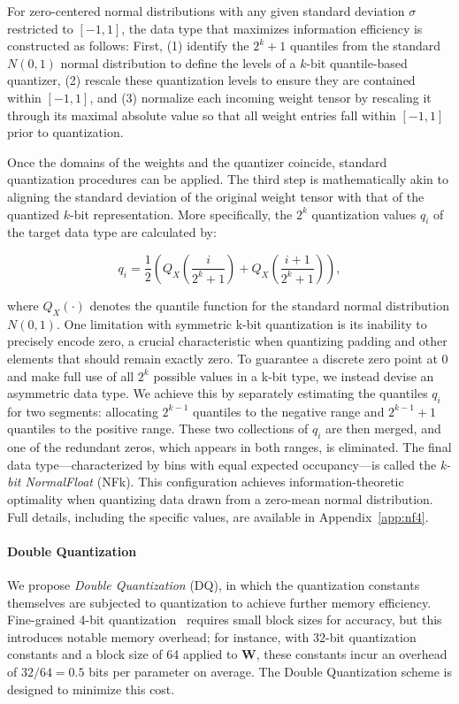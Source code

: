 For zero-centered normal distributions with any given standard deviation $\sigma$ restricted to $[-1, 1]$, the data type that maximizes information efficiency is constructed as follows: First, (1) identify the $2^k + 1$ quantiles from the standard $N(0, 1)$ normal distribution to define the levels of a $k$-bit quantile-based quantizer, (2) rescale these quantization levels to ensure they are contained within $[-1, 1]$, and (3) normalize each incoming weight tensor by rescaling it through its maximal absolute value so that all weight entries fall within $[-1, 1]$ prior to quantization.

Once the domains of the weights and the quantizer coincide, standard quantization procedures can be applied. The third step is mathematically akin to aligning the standard deviation of the original weight tensor with that of the quantized $k$-bit representation. More specifically, the $2^k$ quantization values $q_i$ of the target data type are calculated by:

\begin{equation}
q_i  = \frac{1}{2}\left( Q_X\left(\frac{i}{2^k+1}\right) + Q_X\left(\frac{i+1}{2^k+1}\right)\right),
\end{equation}

where $Q_X(\cdot)$ denotes the quantile function for the standard normal distribution $N(0,1)$. One limitation with symmetric k-bit quantization is its inability to precisely encode zero, a crucial characteristic when quantizing padding and other elements that should remain exactly zero. To guarantee a discrete zero point at $0$ and make full use of all $2^k$ possible values in a k-bit type, we instead devise an asymmetric data type. We achieve this by separately estimating the quantiles $q_i$ for two segments: allocating $2^{k-1}$ quantiles to the negative range and $2^{k-1}+1$ quantiles to the positive range. These two collections of $q_i$ are then merged, and one of the redundant zeros, which appears in both ranges, is eliminated. The final data type—characterized by bins with equal expected occupancy—is called the \emph{k-bit NormalFloat} (NFk). This configuration achieves information-theoretic optimality when quantizing data drawn from a zero-mean normal distribution. Full details, including the specific values, are available in Appendix~\ref{app:nf4}.

\paragraph{Double Quantization{}}
We propose \emph{Double Quantization} (DQ), in which the quantization constants themselves are subjected to quantization to achieve further memory efficiency. Fine-grained 4-bit quantization~\citep{dettmers2022case} requires small block sizes for accuracy, but this introduces notable memory overhead; for instance, with 32-bit quantization constants and a block size of 64 applied to $\mathbf{W}$, these constants incur an overhead of $32/64 = 0.5$ bits per parameter on average. The Double Quantization scheme is designed to minimize this cost.

